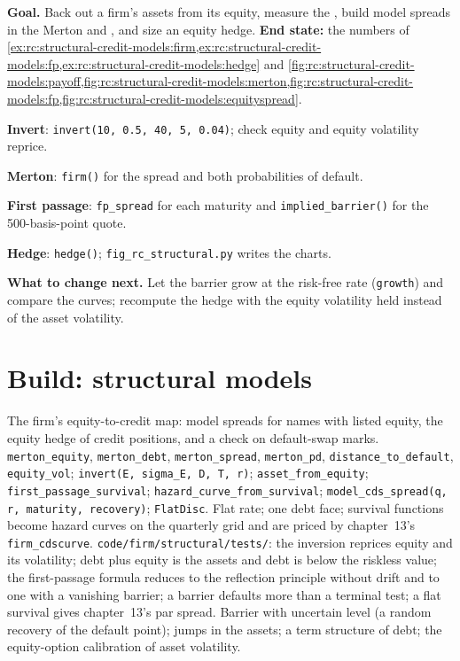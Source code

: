 \begin{tutorial}
\textbf{Goal.} Back out a firm's assets from its equity, measure the ,
build model spreads in the Merton and , and size an equity hedge.
\textbf{End state:} the numbers of
\cref{ex:rc:structural-credit-models:firm,ex:rc:structural-credit-models:fp,ex:rc:structural-credit-models:hedge}
and \cref{fig:rc:structural-credit-models:payoff,fig:rc:structural-credit-models:merton,fig:rc:structural-credit-models:fp,fig:rc:structural-credit-models:equityspread}.
\begin{tutsteps}
\item \textbf{Invert}: \texttt{invert(10, 0.5, 40, 5, 0.04)}; check equity and equity
volatility reprice.
\item \textbf{Merton}: \texttt{firm()} for the spread and both probabilities of default.
\item \textbf{First passage}: \texttt{fp\_spread} for each maturity and
\texttt{implied\_barrier()} for the 500-basis-point quote.
\item \textbf{Hedge}: \texttt{hedge()}; \texttt{fig\_rc\_structural.py} writes the charts.
\end{tutsteps}
\textbf{What to change next.} Let the barrier grow at the risk-free rate
(\texttt{growth}) and compare the curves; recompute the hedge with the equity volatility
held instead of the asset volatility.
\end{tutorial}

\section{Build: structural models}\label{bld:rc:structural-credit-models:structural}

\begin{build}
 The firm's equity-to-credit map: model spreads for names with listed
equity, the equity hedge of credit positions, and a check on default-swap marks.
 \texttt{merton\_equity}, \texttt{merton\_debt}, \texttt{merton\_spread},
\texttt{merton\_pd}, \texttt{distance\_to\_default}, \texttt{equity\_vol}; \texttt{invert(E,
sigma\_E, D, T, r)}; \texttt{asset\_from\_equity}; \texttt{first\_passage\_survival};
\texttt{hazard\_curve\_from\_survival}; \texttt{model\_cds\_spread(q, r, maturity,
recovery)}; \texttt{FlatDisc}.
 Flat rate; one debt face; survival functions become hazard curves on the
quarterly grid and are priced by chapter~13's \texttt{firm\_cdscurve}.
 \texttt{code/firm/structural/tests/}: the inversion reprices
equity and its volatility; debt plus equity is the assets and debt is below the riskless
value; the first-passage formula reduces to the reflection principle without drift and to
one with a vanishing barrier; a barrier defaults more than a terminal test; a flat
survival gives chapter~13's par spread.
 Barrier with uncertain level (a random recovery of the default point);
jumps in the assets; a term structure of debt; the equity-option calibration of asset
volatility.
\end{build}

